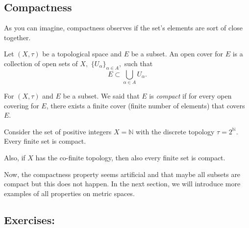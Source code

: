 \documentclass[
	fontsize=10pt, %
	twoside=false, %
	secnumdepth=1, %
]{kaobook}
\begin{document}
\subsection{Compactness}

As you can imagine, compactness observes if the set's elements are sort of close together.  


\begin{definition}
Let $(X,\tau)$ be a topological space and $E$ be a subset. An open cover for $E$ is a collection of open sets of $X,$ $\{U_\alpha\}_{\alpha\in A},$ such that $$E\subset \bigcup_{\alpha\in A} U_\alpha.$$
\end{definition}

\begin{definition}
For $(X,\tau)$ and $E$ be a subset. We said that $E$ is \emph{compact} if for every open covering for $E$, there exists a finite cover (finite number of elements) that covers $E.$
\end{definition}

\begin{example}
Consider the set of positive integers $X=\mathbb{N}$ with the discrete topology $\tau=2^{\mathbb{N}}.$ Every finite set is compact. 

Also, if $X$ has the co-finite topology, then also every finite set is compact.
\end{example}

Now, the compactness property seems artificial and that maybe all subsets are compact but this does not happen. In the next section, we will introduce more examples of all properties on metric spaces.

\subsection{Exercises:}
\end{document}
